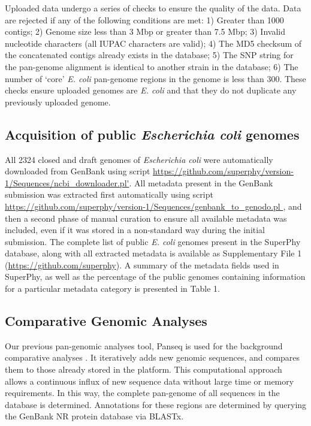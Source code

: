 \documentclass[doublespacing, linenumbers]{bmcart}
\begin{document}
Uploaded data undergo a series of checks to ensure the quality of the data. Data are rejected if any of the following conditions are met: 1) Greater than 1000 contigs; 2) Genome size less than 3 Mbp or greater than 7.5 Mbp; 3) Invalid nucleotide characters (all IUPAC characters are valid); 4) The MD5 checksum of the concatenated contigs already exists in the database; 5) The SNP string for the pan-genome alignment is identical to another strain in the database; 6) The number of `core' \textit{E. coli} pan-genome regions in the genome is less than 300. These checks ensure uploaded genomes are \textit{E. coli} and that they do not duplicate any previously uploaded genome.

\subsection{Acquisition of public \textit{Escherichia coli} genomes}
All 2324 closed and draft genomes of \textit{Escherichia coli} were automatically downloaded from GenBank using script \url{https://github.com/superphy/version-1/Sequences/ncbi_downloader.pl'}. All metadata present in the GenBank submission was extracted first automatically using script \url{https://github.com/superphy/version-1/Sequences/genbank_to_genodo.pl }, and then a second phase of manual curation to ensure all available metadata was included, even if it was stored in a non-standard way during the initial submission. The complete list of public \textit{E. coli} genomes present in the SuperPhy database, along with all extracted metadata is available as Supplementary File 1 (\url{https://github.com/superphy}). A summary of the metadata fields used in SuperPhy, as well as the percentage of the public genomes containing information for a particular metadata category is presented in Table 1.

\subsection{Comparative Genomic Analyses}
Our previous pan-genomic analyses tool, Panseq is used for the background comparative analyses \cite{laing_pan-genome_2010}. It iteratively adds new genomic sequences, and compares them to those already stored in the platform. This computational approach allows a continuous influx of new sequence data without large time or memory requirements. In this way, the complete pan-genome of all sequences in the database is determined. Annotations for these regions are determined by querying the GenBank NR protein database via BLASTx.
\end{document}

